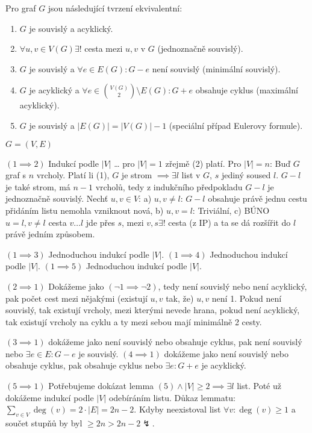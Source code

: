 \documentclass[12pt]{article}					%
\begin{document}
        \begin{veta}
            Pro graf $G$ jsou následující tvrzení ekvivalentní:
            \begin{enumerate}
                \item $G$ je souvislý a acyklický.
                \item $\forall u, v \in V(G) \exists!$ cesta mezi $u, v$ v $G$ (jednoznačně souvislý).
                \item $G$ je souvislý a $\forall e \in E(G): G-e$ není souvislý (minimální souvislý).
                \item $G$ je acyklický a $\forall e \in \binom{V(G)}{2} \setminus E(G): G + e$ obsahuje cyklus (maximální acyklický).
                \item $G$ je souvislý a $|E(G)| = |V(G)| - 1$ (speciální případ Eulerovy formule).
            \end{enumerate}
            \begin{dukazin}
                $G = (V, E)$

                $(1 \implies 2)$ Indukcí podle $|V|$ … pro $|V| = 1$ zřejmě (2) platí. Pro $|V| = n$: Buď $G$ graf s $n$ vrcholy. Platí li (1), $G$ je strom $\implies \exists l$ list v $G$, $s$ jediný soused $l$. $G-l$ je také strom, má $n-1$ vrcholů, tedy z indukčního předpokladu $G-l$ je jednoznačně souvislý. Nechť $u, v \in V$: a) $u, v ≠ l$: $G-l$ obsahuje právě jednu cestu přidáním listu nemohla vzniknout nová, b) $u, v = l$: Triviální, c) BÚNO $u=l, v≠l$ cesta $v…l$ jde přes $s$, mezi $v, s \exists!$ cesta (z IP) a ta se dá rozšířit do $l$ právě jedním způsobem.

                $(1 \implies 3)$ Jednoduchou indukcí podle $|V|$. $(1 \implies 4)$ Jednoduchou indukcí podle $|V|$. $(1 \implies 5)$ Jednoduchou indukcí podle $|V|$.

                $(2 \implies 1)$ Dokážeme jako $(\neg 1 \implies \neg 2)$, tedy není souvislý nebo není acyklický, pak počet cest mezi nějakými (existují $u, v$ tak, že) $u, v$ není 1. Pokud není souvislý, tak existují vrcholy, mezi kterými nevede hrana, pokud není acyklický, tak existují vrcholy na cyklu a ty mezi sebou mají minimálně 2 cesty.

                $(3 \implies 1)$ dokážeme jako není souvislý nebo obsahuje cyklus, pak není souvislý nebo $\exists e \in E: G-e$ je souvislý. $(4 \implies 1)$ dokážeme jako není souvislý nebo obsahuje cyklus, pak obsahuje cyklus nebo $\exists e: G+e$ je acyklický.

                $(5 \implies 1)$ Potřebujeme dokázat lemma $(5) \land |V|≥2 \implies \exists l$ list. Poté už dokážeme indukcí podle $|V|$ odebíráním listu. Důkaz lemmatu: $\sum_{v\in V} \deg(v) = 2·|E|=2n-2$. Kdyby neexistoval list $\forall v: \deg(v) ≥ 1$ a součet stupňů by byl $≥2n>2n-2 \lightning$.
            \end{dukazin}
        \end{veta}
\end{document}
